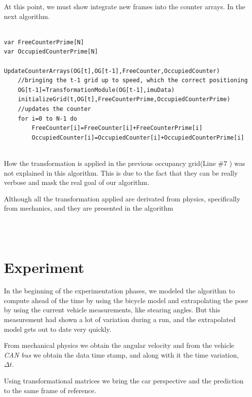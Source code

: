 At this point, we must show integrate new frames into the counter arrays. In the next algorithm.

\begin{lstlisting}[title={Newframes},label=al:newframes,caption={Integrating new frames}]

var FreeCounterPrime[N]
var OccupiedCounterPrime[N]

UpdateCounterArrays(OG[t],OG[t-1],FreeCounter,OccupiedCounter)
	//bringing the t-1 grid up to speed, which the correct positioning
	OG[t-1]=TransformationModule(OG[t-1],imuData)
	initializeGrid(t,OG[t],FreeCounterPrime,OccupiedCounterPrime)
	//updates the counter
	for i=0 to N-1 do
		FreeCounter[i]=FreeCounter[i]+FreeCounterPrime[i]
		OccupiedCounter[i]=OccupiedCounter[i]+OccupiedCounterPrime[i]
	
\end{lstlisting}

How the transformation is applied in the previous occupancy grid(Line $\#7$ ) was not explained in this algorithm. This is due to the fact that they can be really verbose and mask the real goal of our algorithm. 

Although all the transformation applied are derivated from physics, specifically from mechanics, and they are presented in the algorithm 

\begin{lstlisting}[title={Transformation},label=al:transformation,caption={Previous grid transformation}]



\end{lstlisting}

\section{Experiment}

In the beginning of the experimentation phases, we modeled the algorithm to compute ahead of the time by using the bicycle model and extrapolating the pose by using the current vehicle measurements, like stearing angles. But this measurement had shown a lot of variation during a run, and the extrapolated model gets out to date very quickly.

From mechanical physics we obtain the angular velocity and from the vehicle \emph{CAN bus} we obtain the data time stamp, and along with it the time variation, $\Delta t$.

Using transformational matrices we bring the car perspective \cite{iyengar1991autonomous} and the prediction to the same frame of reference.


